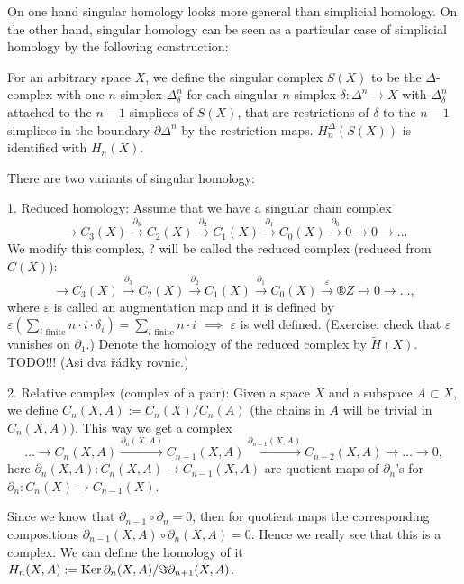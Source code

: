 \documentclass[12pt]{article}					%
\begin{document}
\begin{poznamka}
	On one hand singular homology looks more general than simplicial homology. On the other hand, singular homology can be seen as a particular case of simplicial homology by the following construction:

	For an arbitrary space $X$, we define the singular complex $S(X)$ to be the $Δ$-complex with one $n$-simplex $Δ^n_δ$ for each singular $n$-simplex $δ: Δ^n \rightarrow X$ with $Δ^n_δ$ attached to the $n-1$ simplices of $S(X)$, that are restrictions of $δ$ to the $n-1$ simplices in the boundary $\partial Δ^n$ by the restriction maps. $H_n^Δ(S(X))$ is identified with $H_n(X)$.
\end{poznamka}

\begin{poznamka}
	There are two variants of singular homology:

	1. Reduced homology: Assume that we have a singular chain complex
	$$ \rightarrow C_3(X) \overset{\partial_3}\rightarrow C_2(X) \overset{\partial_2}\rightarrow C_1(X) \overset{\partial_1}\rightarrow C_0(X) \overset{\partial_0}\rightarrow 0 \rightarrow 0 \rightarrow … $$
	We modify this complex, ? will be called the reduced complex (reduced from $C(X)$):
	$$ \rightarrow C_3(X) \overset{\partial_3}\rightarrow C_2(X) \overset{\partial_2}\rightarrow C_1(X) \overset{\partial_1}\rightarrow C_0(X) \overset{ε}\rightarrow ®Z \rightarrow 0 \rightarrow …, $$
	where $ε$ is called an augmentation map and it is defined by $ε(\sum_{i \text{ finite}} n·i·δ_i) = \sum_{i \text{ finite}} n·i$ $\implies$ $ε$ is well defined. (Exercise: check that $ε$ vanishes on $\partial_1$.) Denote the homology of the reduced complex by $\tilde H(X)$.
	TODO!!! (Asi dva řádky rovnic.)

	2. Relative complex (complex of a pair): Given a space $X$ and a subspace $A \subset X$, we define $C_n(X, A) := C_n(X) / C_n(A)$ (the chains in $A$ will be trivial in $C_n(X, A)$). This way we get a complex
	$$ … \rightarrow C_n(X, A) \overset{\partial_n(X, A)}\rightarrow C_{n-1}(X, A) \overset{\partial_{n-1}(X, A)}\rightarrow C_{n-2}(X, A) \rightarrow … \rightarrow 0, $$
	here $\partial_n(X, A): C_n(X, A) \rightarrow C_{n-1}(X, A)$ are quotient maps of $\partial_n$'s for $\partial_n: C_n(X) \rightarrow C_{n-1}(X)$.

	Since we know that $\partial_{n-1}∘\partial_n = 0$, then for quotient maps the corresponding compositions $\partial_{n-1}(X, A)∘\partial_n(X, A) = 0$. Hence we really see that this is a complex. We can define the homology of it $H_n(X, A) := \operatorname{Ker} \partial_n(X, A) / \Im \partial_{n+1}(X, A)$.
\end{poznamka}
\end{document}
